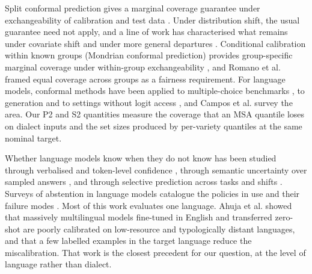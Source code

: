 \documentclass[applsci,article,submit,pdftex,oneauthor]{Definitions/mdpi}
\begin{document}
Split conformal prediction gives a marginal coverage guarantee under exchangeability of calibration and test data \cite{vovk2005algorithmic, angelopoulos2023conformal}. Under distribution shift, the usual guarantee need not apply, and a line of work has characterised what remains under covariate shift \cite{tibshirani2019conformal} and under more general departures \cite{barber2023conformal}. Conditional calibration within known groups (Mondrian conformal prediction) provides group-specific marginal coverage under within-group exchangeability \cite{vovk2012conditional}, and Romano et al. \cite{romano2020malice} framed equal coverage across groups as a fairness requirement. For language models, conformal methods have been applied to multiple-choice benchmarks \cite{kumar2023conformal, ye2024benchmarking}, to generation \cite{quach2024conformal, mohri2024conformal} and to settings without logit access \cite{su2024api}, and Campos et al. \cite{campos2024conformal} survey the area. Our P2 and S2 quantities measure the coverage that an MSA quantile loses on dialect inputs and the set sizes produced by per-variety quantiles at the same nominal target.

Whether language models know when they do not know has been studied through verbalised and token-level confidence \cite{kadavath2022language, xiong2024can}, through semantic uncertainty over sampled answers \cite{kuhn2023semantic}, and through selective prediction across tasks and shifts \cite{varshney2022investigating, chen2023adaptation}. Surveys of abstention in language models catalogue the policies in use and their failure modes \cite{wen2025know}. Most of this work evaluates one language. Ahuja et al. \cite{ahuja2022calibration} showed that massively multilingual models fine-tuned in English and transferred zero-shot are poorly calibrated on low-resource and typologically distant languages, and that a few labelled examples in the target language reduce the miscalibration. That work is the closest precedent for our question, at the level of language rather than dialect.
\end{document}
